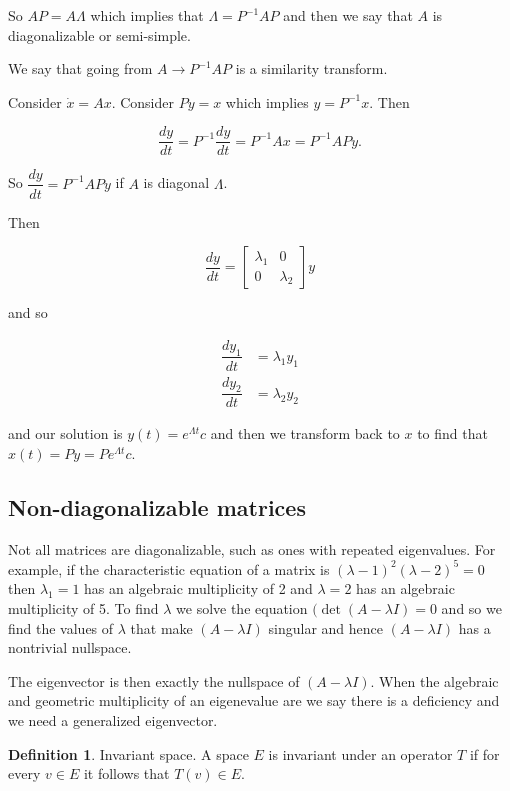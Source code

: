 \documentclass[12pt]{article}
\theoremstyle{definition}
\newtheorem*{definition}{Definition}
\begin{document}
So $AP = A \Lambda$ which implies that $\Lambda = P^{-1}AP$ and then we say that $A$ is diagonalizable or semi-simple.

We say that going from $A \rightarrow P^{-1}AP$ is a similarity transform.

Consider $\dot x = Ax$. Consider $Py = x$ which implies $y = P^{-1}x$. Then

\[
\dfrac{dy}{dt} = P^{-1} \dfrac{dy}{dt} = P^{-1}Ax = P^{-1}APy.
\]

So $\dfrac{dy}{dt} = P^{-1}APy$ if $A$ is diagonal $\Lambda$.

Then

\[
\dfrac{dy}{dt} = \begin{bmatrix} \lambda_1 & 0 \\ 0 & \lambda_2 \end{bmatrix} y
\]

and so 

\begin{align*}
\dfrac{dy_1}{dt} &= \lambda_1 y_1 \\
\dfrac{dy_2}{dt} &= \lambda_2 y_2
\end{align*}

and our solution is $y(t) = e^{\Lambda t}c$ and then we transform back to $x$ to find that $x(t) = Py = Pe^{\Lambda t} c$.

\subsection{Non-diagonalizable matrices}

Not all matrices are diagonalizable, such as ones with repeated eigenvalues. For example, if the characteristic equation of a
matrix is $(\lambda - 1)^2 (\lambda - 2)^5 = 0$ then $\lambda_1 = 1$ has an algebraic multiplicity of 2 and $\lambda = 2$ has
an algebraic multiplicity of 5. To find $\lambda$ we solve the equation $(\det (A - \lambda I) = 0$ and so we find the 
values of $\lambda$ that make $(A-\lambda I)$ singular and hence $(A-\lambda I)$ has a nontrivial nullspace.

The eigenvector is then exactly the nullspace of $(A - \lambda I)$. When the algebraic and geometric multiplicity of an
eigenevalue are we say there is a deficiency and we need a generalized eigenvector.

\begin{definition} Invariant space.
A space $E$ is invariant under an operator $T$ if for every $v \in E$ it follows that $T(v) \in E$.
\end{definition} 
\end{document}
